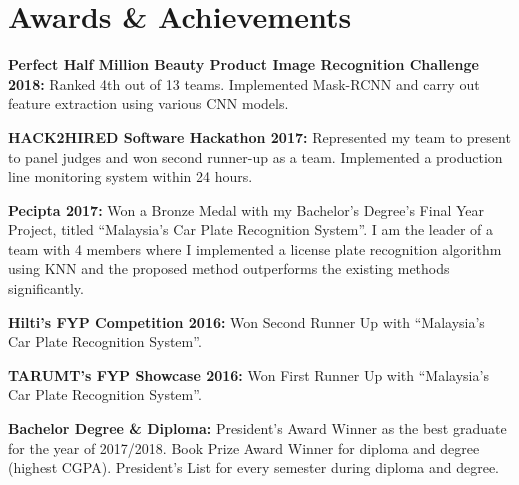 \documentclass[letterpaper,11pt]{article}
\newcommand{\resumeSubHeadingListStart}{\begin{itemize}[leftmargin=0.15in, label={}]}
\newcommand{\resumeSubHeadingListEnd}{\end{itemize}}
\begin{document}
\section{Awards \& Achievements}
  \vspace{2pt}
  \resumeSubHeadingListStart
    \small{\item{
        \textbf{Perfect Half Million Beauty Product Image Recognition Challenge 2018:}{ Ranked 4th out of 13 teams. Implemented Mask-RCNN and carry out feature extraction using various CNN models.} \\ \vspace{3pt}
        
        \textbf{HACK2HIRED Software Hackathon 2017:}{ Represented my team to present to panel judges and won second runner-up as a team. Implemented a production line monitoring system within 24 hours.} \\ \vspace{3pt}
        
        \textbf{Pecipta 2017:}{ Won a Bronze Medal with my Bachelor's Degree's Final Year Project, titled \enquote{Malaysia’s Car Plate Recognition System}. I am the leader of a team with 4 members where I implemented a license plate recognition algorithm using KNN and the proposed method outperforms the existing methods significantly.} \\ \vspace{3pt}
        
        \textbf{Hilti's FYP Competition 2016:}{ Won Second Runner Up with \enquote{Malaysia’s Car Plate Recognition System}.} \\ \vspace{3pt}
        
        \textbf{TARUMT's FYP Showcase 2016:}{ Won First Runner Up with \enquote{Malaysia’s Car Plate Recognition System}.} \\ \vspace{3pt}
        
        \textbf{Bachelor Degree \& Diploma:}{ President’s Award Winner as the best graduate for the year of 2017/2018. Book Prize Award Winner for diploma and degree (highest CGPA). President’s List for every semester during diploma and degree.} 
        
    }}
  \resumeSubHeadingListEnd


\end{document}
